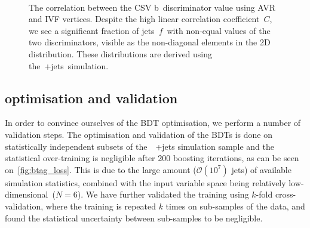 \begin{figure}
\begin{centering}
 \\
\caption[The correlation between the CSV b~discriminator value using AVR and IVF vertices]{The correlation between the CSV b~discriminator value using AVR and IVF vertices. Despite the high linear correlation coefficient~$C$, we see a significant fraction of jets~$f$~with non-equal values of the two discriminators, visible as the non-diagonal elements in the 2D distribution. These distributions are derived using the~\ttbar+jets~simulation.}
\label{fig:btag_csv_correlation}
\end{centering}
\end{figure}

\subsection{optimisation and validation}
In order to convince ourselves of the BDT optimisation, we perform a number of validation steps. The optimisation and validation of the BDTs is done on statistically independent subsets of the~\ttbar~+jets simulation sample and the statistical over-training is negligible after 200 boosting iterations, as can be seen on~\cref{fig:btag_loss}. This is due to the large amount ($\mathcal{O}(10^7)$ jets) of available simulation statistics, combined with the input variable space being relatively low-dimensional~($N=6$). We have further validated the training using $k$-fold cross-validation, where the training is repeated $k$ times on sub-samples of the data, and found the statistical uncertainty between sub-samples to be negligible.

